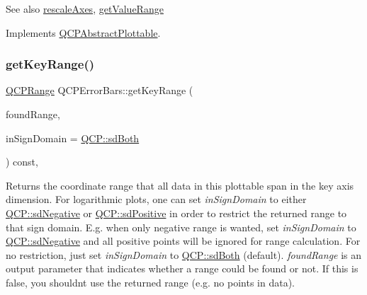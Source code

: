\begin{DoxySeeAlso}{See also}
\hyperlink{class_q_c_p_abstract_plottable_a1491c4a606bccd2d09e65e11b79eb882}{rescale\+Axes}, \hyperlink{class_q_c_p_error_bars_ab76215a186ae4862235821e028685f26}{get\+Value\+Range} 
\end{DoxySeeAlso}


Implements \hyperlink{class_q_c_p_abstract_plottable_a4da16d3cd4b509e1104a9b0275623c96}{Q\+C\+P\+Abstract\+Plottable}.

\mbox{\label{class_q_c_p_error_bars_a6cac828a430d66ac77a167549d01d212}} 
\subsubsection{\texorpdfstring{get\+Key\+Range()}{getKeyRange()}\hspace{0.1cm}{\footnotesize\ttfamily [2/2]}}
{\footnotesize\ttfamily \hyperlink{class_q_c_p_range}{Q\+C\+P\+Range} Q\+C\+P\+Error\+Bars\+::get\+Key\+Range (\begin{DoxyParamCaption}\item[{bool \&}]{found\+Range,  }\item[{\hyperlink{namespace_q_c_p_afd50e7cf431af385614987d8553ff8a9}{Q\+C\+P\+::\+Sign\+Domain}}]{in\+Sign\+Domain = {\ttfamily \hyperlink{namespace_q_c_p_afd50e7cf431af385614987d8553ff8a9a3dee7e9cd2fedce9253b83e172626a6c}{Q\+C\+P\+::sd\+Both}} }\end{DoxyParamCaption}) const\hspace{0.3cm}{\ttfamily [protected]}, {\ttfamily [virtual]}}

Returns the coordinate range that all data in this plottable span in the key axis dimension. For logarithmic plots, one can set {\itshape in\+Sign\+Domain} to either \hyperlink{namespace_q_c_p_afd50e7cf431af385614987d8553ff8a9a0b464fa3135be2808909739a969193c9}{Q\+C\+P\+::sd\+Negative} or \hyperlink{namespace_q_c_p_afd50e7cf431af385614987d8553ff8a9a23362334a52289677a51526a9b68db6c}{Q\+C\+P\+::sd\+Positive} in order to restrict the returned range to that sign domain. E.\+g. when only negative range is wanted, set {\itshape in\+Sign\+Domain} to \hyperlink{namespace_q_c_p_afd50e7cf431af385614987d8553ff8a9a0b464fa3135be2808909739a969193c9}{Q\+C\+P\+::sd\+Negative} and all positive points will be ignored for range calculation. For no restriction, just set {\itshape in\+Sign\+Domain} to \hyperlink{namespace_q_c_p_afd50e7cf431af385614987d8553ff8a9a3dee7e9cd2fedce9253b83e172626a6c}{Q\+C\+P\+::sd\+Both} (default). {\itshape found\+Range} is an output parameter that indicates whether a range could be found or not. If this is false, you shouldn\textquotesingle{}t use the returned range (e.\+g. no points in data).

